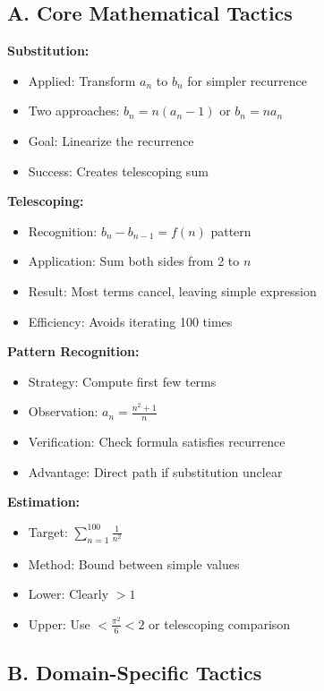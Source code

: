 \documentclass[12pt]{article}
\begin{document}
\begin{tacticalbox}

\subsection*{A. Core Mathematical Tactics}

\textbf{Substitution:}
\begin{itemize}
    \item Applied: Transform $a_n$ to $b_n$ for simpler recurrence
    \item Two approaches: $b_n = n(a_n-1)$ or $b_n = na_n$
    \item Goal: Linearize the recurrence
    \item Success: Creates telescoping sum
\end{itemize}

\textbf{Telescoping:}
\begin{itemize}
    \item Recognition: $b_n - b_{n-1} = f(n)$ pattern
    \item Application: Sum both sides from 2 to $n$
    \item Result: Most terms cancel, leaving simple expression
    \item Efficiency: Avoids iterating 100 times
\end{itemize}

\textbf{Pattern Recognition:}
\begin{itemize}
    \item Strategy: Compute first few terms
    \item Observation: $a_n = \frac{n^2+1}{n}$
    \item Verification: Check formula satisfies recurrence
    \item Advantage: Direct path if substitution unclear
\end{itemize}

\textbf{Estimation:}
\begin{itemize}
    \item Target: $\sum_{n=1}^{100} \frac{1}{n^2}$
    \item Method: Bound between simple values
    \item Lower: Clearly $> 1$
    \item Upper: Use $< \frac{\pi^2}{6} < 2$ or telescoping comparison
\end{itemize}

\subsection*{B. Domain-Specific Tactics}


\end{tacticalbox}
\end{document}
